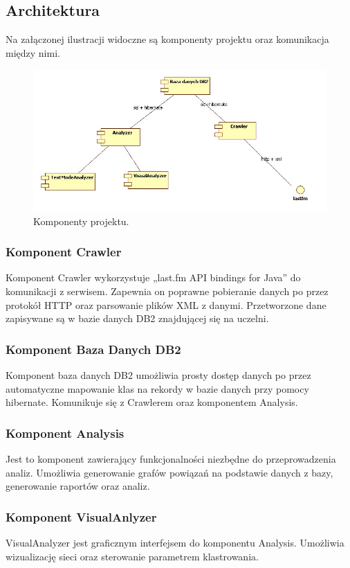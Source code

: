 \documentclass[10pt,a4paper,epic,carom]{article}
\begin{document}
\subsection {Architektura}
Na załączonej ilustracji widoczne są komponenty projektu oraz komunikacja między nimi.

\begin{figure}[H]
\centering
\caption{Komponenty projektu.}
\includegraphics[scale=0.65]{rys1.png}
\end{figure}

\subsubsection {Komponent Crawler}
	Komponent Crawler wykorzystuje „last.fm API bindings for Java” do komunikacji z serwisem. Zapewnia on poprawne pobieranie danych po przez protokół HTTP oraz parsowanie plików XML z danymi. Przetworzone dane zapisywane są w bazie danych DB2 znajdującej się na uczelni.
\subsubsection {Komponent Baza Danych DB2}
	Komponent baza danych DB2 umożliwia prosty dostęp danych po przez automatyczne mapowanie klas na rekordy w bazie danych przy pomocy hibernate. Komunikuje się z Crawlerem oraz komponentem Analysis.
\subsubsection {Komponent Analysis}
	Jest to komponent zawierający funkcjonalności niezbędne do przeprowadzenia analiz. Umożliwia generowanie grafów powiązań na podstawie danych z bazy, generowanie raportów oraz analiz.
\subsubsection {Komponent VisualAnlyzer}
	VisualAnalyzer jest graficznym interfejsem do komponentu Analysis. Umożliwia wizualizację sieci oraz sterowanie parametrem klastrowania.
\end{document}
